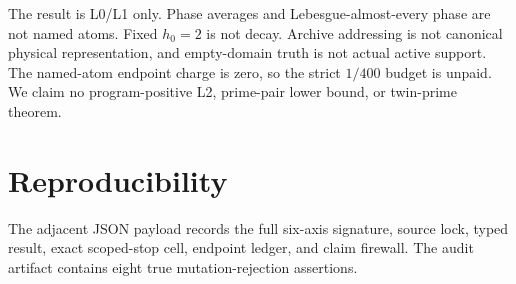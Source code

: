 \documentclass[11pt]{article}
\begin{document}
The result is L0/L1 only.  Phase averages and Lebesgue-almost-every phase are
not named atoms.  Fixed $h_0=2$ is not decay.  Archive addressing is not
canonical physical representation, and empty-domain truth is not actual
active support.  The named-atom endpoint charge is zero, so the strict
$1/400$ budget is unpaid.  We claim no program-positive L2, prime-pair lower
bound, or twin-prime theorem.

\section{Reproducibility}
The adjacent JSON payload records the full six-axis signature, source lock,
typed result, exact scoped-stop cell, endpoint ledger, and claim firewall.
The audit artifact contains eight true mutation-rejection assertions.


\end{document}
